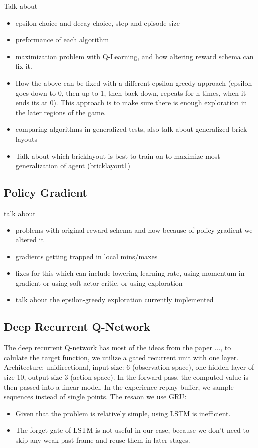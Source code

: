 \documentclass[twoside,11pt]{article}
\begin{document}
Talk about
\begin{itemize}
\item epsilon choice and decay choice, step and episode size
\item preformance of each algorithm
\item maximization problem with Q-Learning, and how altering reward schema can fix it.
\item How the above can be fixed with a different epsilon greedy approach (epsilon goes down to 0, then up to 1, then back down, repeats for n times, when it ends its at 0). This approach is to make sure there is enough exploration in the later regions of the game.
\item comparing algorithms in generalized tests, also talk about generalized brick layouts
\item Talk about which bricklayout is best to train on to maximize most generalization of agent (bricklayout1)
\end{itemize}

\subsection{Policy Gradient}
talk about
\begin{itemize}
\item problems with original reward schema and how because of policy gradient we altered it
\item gradients getting trapped in local mins/maxes
\item fixes for this which can include lowering learning rate, using momentum in gradient or using soft-actor-critic, or using exploration
\item talk about the epsilon-greedy exploration currently implemented
\end{itemize}



\subsection{Deep Recurrent Q-Network}
The deep recurrent Q-network has most of the ideas from the paper ..., to calulate the target function, we utilize a gated recurrent unit with one layer. Architecture: unidirectional, input size: 6 (observation space), one hidden layer of size 10, output size 3 (action space). In the forward pass, the computed value is then passed into a linear model. In the experience replay buffer, we sample sequences instead of single points.
\newline
The resaon we use GRU: \newline
\begin{itemize}
\item Given that the problem is relatively simple, using LSTM is inefficient.
\item The forget gate of LSTM is not useful in our case, because we don't need to skip any weak past frame and reuse them in later stages. 
\end{itemize}

\end{document}
